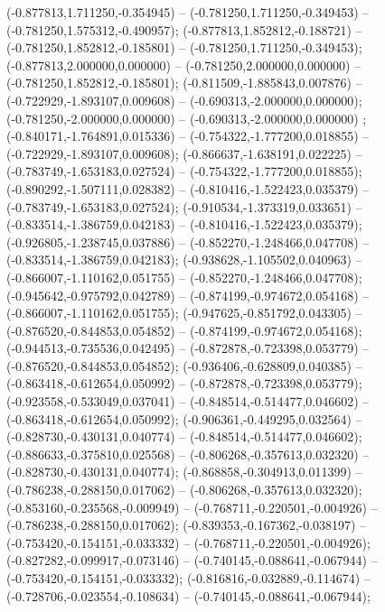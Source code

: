  (-0.877813,1.711250,-0.354945) -- (-0.781250,1.711250,-0.349453) -- (-0.781250,1.575312,-0.490957);
 (-0.877813,1.852812,-0.188721) -- (-0.781250,1.852812,-0.185801) -- (-0.781250,1.711250,-0.349453);
 (-0.877813,2.000000,0.000000) -- (-0.781250,2.000000,0.000000) -- (-0.781250,1.852812,-0.185801);
 (-0.811509,-1.885843,0.007876) -- (-0.722929,-1.893107,0.009608) -- (-0.690313,-2.000000,0.000000);
 (-0.781250,-2.000000,0.000000) -- (-0.690313,-2.000000,0.000000) ;
 (-0.840171,-1.764891,0.015336) -- (-0.754322,-1.777200,0.018855) -- (-0.722929,-1.893107,0.009608);
 (-0.866637,-1.638191,0.022225) -- (-0.783749,-1.653183,0.027524) -- (-0.754322,-1.777200,0.018855);
 (-0.890292,-1.507111,0.028382) -- (-0.810416,-1.522423,0.035379) -- (-0.783749,-1.653183,0.027524);
 (-0.910534,-1.373319,0.033651) -- (-0.833514,-1.386759,0.042183) -- (-0.810416,-1.522423,0.035379);
 (-0.926805,-1.238745,0.037886) -- (-0.852270,-1.248466,0.047708) -- (-0.833514,-1.386759,0.042183);
 (-0.938628,-1.105502,0.040963) -- (-0.866007,-1.110162,0.051755) -- (-0.852270,-1.248466,0.047708);
 (-0.945642,-0.975792,0.042789) -- (-0.874199,-0.974672,0.054168) -- (-0.866007,-1.110162,0.051755);
 (-0.947625,-0.851792,0.043305) -- (-0.876520,-0.844853,0.054852) -- (-0.874199,-0.974672,0.054168);
 (-0.944513,-0.735536,0.042495) -- (-0.872878,-0.723398,0.053779) -- (-0.876520,-0.844853,0.054852);
 (-0.936406,-0.628809,0.040385) -- (-0.863418,-0.612654,0.050992) -- (-0.872878,-0.723398,0.053779);
 (-0.923558,-0.533049,0.037041) -- (-0.848514,-0.514477,0.046602) -- (-0.863418,-0.612654,0.050992);
 (-0.906361,-0.449295,0.032564) -- (-0.828730,-0.430131,0.040774) -- (-0.848514,-0.514477,0.046602);
 (-0.886633,-0.375810,0.025568) -- (-0.806268,-0.357613,0.032320) -- (-0.828730,-0.430131,0.040774);
 (-0.868858,-0.304913,0.011399) -- (-0.786238,-0.288150,0.017062) -- (-0.806268,-0.357613,0.032320);
 (-0.853160,-0.235568,-0.009949) -- (-0.768711,-0.220501,-0.004926) -- (-0.786238,-0.288150,0.017062);
 (-0.839353,-0.167362,-0.038197) -- (-0.753420,-0.154151,-0.033332) -- (-0.768711,-0.220501,-0.004926);
 (-0.827282,-0.099917,-0.073146) -- (-0.740145,-0.088641,-0.067944) -- (-0.753420,-0.154151,-0.033332);
 (-0.816816,-0.032889,-0.114674) -- (-0.728706,-0.023554,-0.108634) -- (-0.740145,-0.088641,-0.067944);

